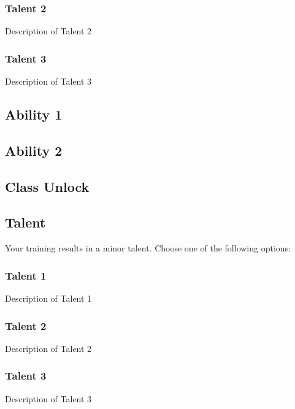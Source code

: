 \subsubsection{Talent 2}
Description of Talent 2

\subsubsection{Talent 3}
Description of Talent 3

\vspace{.1 in}

\subsection*{Ability 1}
\lipsum[1]

\vspace{.1 in}

\subsection*{Ability 2}
\lipsum[1]

\vspace{.1 in}

\subsection*{Class Unlock}
\lipsum[1]

\vspace{.1 in}

\subsection*{Talent}
Your training results in a minor talent. Choose one of the following options:

\subsubsection{Talent 1}
Description of Talent 1

\subsubsection{Talent 2}
Description of Talent 2

\subsubsection{Talent 3}
Description of Talent 3


